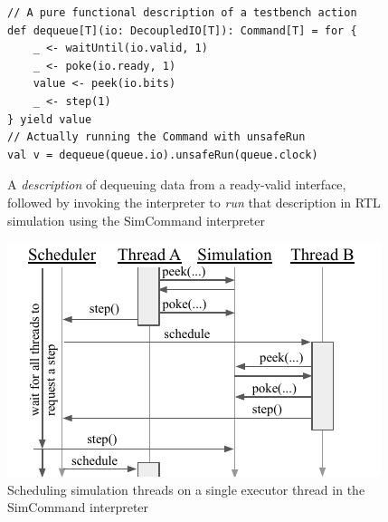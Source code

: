 \documentclass[sigplan,review,nonacm,9pt]{acmart}
\begin{document}
\begin{figure}
\begin{verbatim}
// A pure functional description of a testbench action
def dequeue[T](io: DecoupledIO[T]): Command[T] = for {
    _ <- waitUntil(io.valid, 1)
    _ <- poke(io.ready, 1)
    value <- peek(io.bits)
    _ <- step(1)
} yield value
// Actually running the Command with unsafeRun
val v = dequeue(queue.io).unsafeRun(queue.clock)
\end{verbatim}
\caption{A \textit{description} of dequeuing data from a ready-valid interface, followed by invoking the interpreter to \textit{run} that description in RTL simulation using the SimCommand interpreter}
\label{fig:simcommand}
\end{figure}

\begin{figure}
\includegraphics[scale=1]{simcommand/scheduler.pdf}
\caption{Scheduling simulation threads on a single executor thread in the SimCommand interpreter}
\label{fig:simcommand_interp}
\end{figure}

\renewcommand{\cellalign}{tl}
\renewcommand{\theadalign}{tl}
\end{document}
